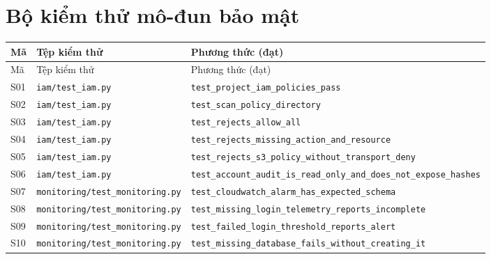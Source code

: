 \section{Bộ kiểm thử mô-đun bảo mật}
{\footnotesize
\begin{longtable}{P{.8cm}P{4cm}P{8cm}}
\toprule Mã & Tệp kiểm thử & Phương thức (đạt)\\\midrule\endfirsthead
\toprule Mã & Tệp kiểm thử & Phương thức (đạt)\\\midrule\endhead
S01 & \nolinkurl{iam/test_iam.py} & \nolinkurl{test_project_iam_policies_pass} \\
S02 & \nolinkurl{iam/test_iam.py} & \nolinkurl{test_scan_policy_directory} \\
S03 & \nolinkurl{iam/test_iam.py} & \nolinkurl{test_rejects_allow_all} \\
S04 & \nolinkurl{iam/test_iam.py} & \nolinkurl{test_rejects_missing_action_and_resource} \\
S05 & \nolinkurl{iam/test_iam.py} & \nolinkurl{test_rejects_s3_policy_without_transport_deny} \\
S06 & \nolinkurl{iam/test_iam.py} & \nolinkurl{test_account_audit_is_read_only_and_does_not_expose_hashes} \\
S07 & \nolinkurl{monitoring/test_monitoring.py} & \nolinkurl{test_cloudwatch_alarm_has_expected_schema} \\
S08 & \nolinkurl{monitoring/test_monitoring.py} & \nolinkurl{test_missing_login_telemetry_reports_incomplete} \\
S09 & \nolinkurl{monitoring/test_monitoring.py} & \nolinkurl{test_failed_login_threshold_reports_alert} \\
S10 & \nolinkurl{monitoring/test_monitoring.py} & \nolinkurl{test_missing_database_fails_without_creating_it} \\
\bottomrule
\end{longtable}}
